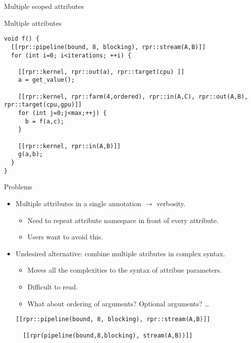 \begin{frame}[t,fragile]{Multiple scoped attributes }

\begin{block}{Multiple attributes}
\begin{lstlisting}[basicstyle=\scriptsize]
void f() {
  [[rpr::pipeline(bound, 8, blocking), rpr::stream(A,B)]]
  for (int i=0; i<iterations; ++i) {

    [[rpr::kernel, rpr::out(a), rpr::target(cpu) ]]
    a = get_value();
    
    [[rpr::kernel, rpr::farm(4,ordered), rpr::in(A,C), rpr::out(A,B), rpr::target(cpu,gpu)]]
    for (int j=0;j<max;++j) {
      b = f(a,c);
    }

    [[rpr::kernel, rpr::in(A,B)]]
    g(a,b);
  }
}
\end{lstlisting}
\end{block}
\end{frame}

\begin{frame}[t,fragile]{Problems}
\begin{itemize}
  \item Multiple attributes in a single annotation $\rightarrow$ verbosity.
    \begin{itemize}
      \item Need to repeat attribute namespace in front of every attribute.
      \item Users want to avoid this.
    \end{itemize}
  \vfill\pause
  \item Undesired alternative: combine multiple atributes in complex syntax.
    \begin{itemize}
      \item Moves all the complexities to the syntax of attribue parameters.
      \item Difficult to read.
      \item What about ordering of arguments? Optional arguments? \ldots
    \end{itemize}
\begin{lstlisting}[basicstyle=\scriptsize]
  [[rpr::pipeline(bound, 8, blocking), rpr::stream(A,B)]]

  [[rpr(pipeline(bound,8,blocking), stream(A,B))]]
\end{lstlisting}
\end{itemize}
\end{frame}

